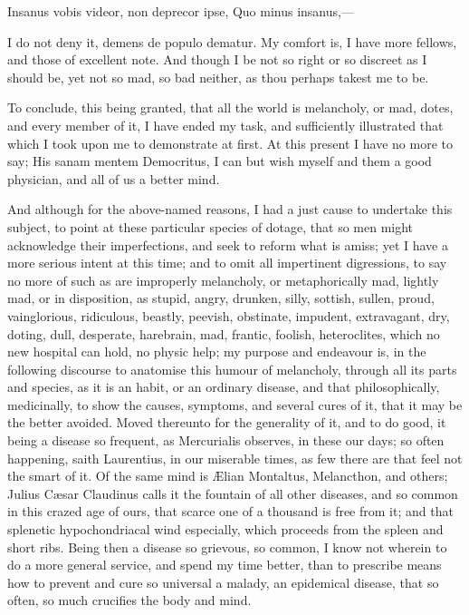 {Insanus vobis videor, non deprecor ipse,
Quo minus insanus,---

I do not deny it, demens de populo dematur. My comfort is, I have more
fellows, and those of excellent note. And though I be not so right or
so discreet as I should be, yet not so mad, so bad neither, as thou
perhaps takest me to be.

To conclude, this being granted, that all the world is melancholy, or
mad, dotes, and every member of it, I have ended my task, and
sufficiently illustrated that which I took upon me to demonstrate at
first. At this present I have no more to say; His sanam mentem
Democritus, I can but wish myself and them a good physician, and all of
us a better mind.

And although for the above-named reasons, I had a just cause to
undertake this subject, to point at these particular species of dotage,
that so men might acknowledge their imperfections, and seek to reform
what is amiss; yet I have a more serious intent at this time; and to
omit all impertinent digressions, to say no more of such as are
improperly melancholy, or metaphorically mad, lightly mad, or in
disposition, as stupid, angry, drunken, silly, sottish, sullen, proud,
vainglorious, ridiculous, beastly, peevish, obstinate, impudent,
extravagant, dry, doting, dull, desperate, harebrain, \etc{} mad, frantic,
foolish, heteroclites, which no new  hospital can hold, no physic
help; my purpose and endeavour is, in the following discourse to
anatomise this humour of melancholy, through all its parts and species,
as it is an habit, or an ordinary disease, and that philosophically,
medicinally, to show the causes, symptoms, and several cures of it,
that it may be the better avoided. Moved thereunto for the generality
of it, and to do good, it being a disease so frequent, as 
Mercurialis observes, in these our days; so often happening, saith
 Laurentius, in our miserable times, as few there are that feel
not the smart of it. Of the same mind is \AE{}lian Montaltus,
Melancthon, and others; Julius C\ae{}sar Claudinus calls it the
fountain of all other diseases, and so common in this crazed age of
ours, that scarce one of a thousand is free from it; and that splenetic
hypochondriacal wind especially, which proceeds from the spleen and
short ribs. Being then a disease so grievous, so common, I know not
wherein to do a more general service, and spend my time better, than to
prescribe means how to prevent and cure so universal a malady, an
epidemical disease, that so often, so much crucifies the body and mind.

}
